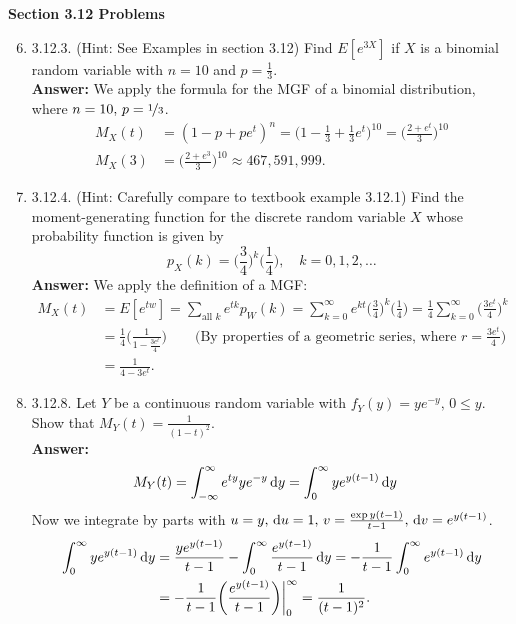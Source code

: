 \documentclass{article}
\begin{document}
    \noindent \textbf{Section 3.12 Problems}
    \begin{enumerate}\setcounter{enumi}{5}
        \item 3.12.3. (Hint: See Examples in section 3.12) Find $E[e^{3X}]$ if $X$ is a binomial random variable with $n = 10$ and $p = \frac{1}{3}$.\\
        \textbf{Answer: }We apply the formula for the MGF of a binomial distribution, where $n=10, \, p=\nicefrac{1}{3}$.
            \begin{align*}
                M_X(t) &= (1-p+pe^t)^n = \bigg(1-\frac{1}{3}+\frac{1}{3}e^t\bigg)^{10} = \bigg(\frac{2+e^t}{3}\bigg)^{10}\\
                M_X(3) &= \bigg(\frac{2+e^3}{3}\bigg)^{10} \approx 467,591,999.
            \end{align*}

        \item 3.12.4. (Hint: Carefully compare to textbook example 3.12.1) Find the moment-generating function for the discrete random variable $X$ whose probability function is given by
            \[p_X(k) = \bigg(\frac{3}{4}\bigg)^k\bigg(\frac{1}{4}\bigg), \quad k=0,1,2,\ldots\]
        \textbf{Answer: }We apply the definition of a MGF:
            \begin{align*}
                M_X(t) &= E[e^{tw}] = \sum_{\text{all $k$}} e^{tk} p_W(k) = \sum_{k=0}^\infty e^{kt}\bigg(\frac{3}{4}\bigg)^k\bigg(\frac{1}{4}\bigg) = \frac{1}{4}\sum_{k=0}^\infty \bigg(\frac{3e^t}{4}\bigg)^k\\
                &= \frac{1}{4}\bigg(\frac{1}{1-\frac{3e^t}{4}}\bigg) \qquad \text{(By properties of a geometric series, where $r = \frac{3e^t}{4}$)}\\
                &= \frac{1}{4-3e^t}.
            \end{align*}
        
        \item 3.12.8. Let $Y$ be a continuous random variable with $f_Y(y) = ye^{-y}, \, 0 \leq y$. Show that $M_Y(t) = \frac{1}{(1-t)^2}$.\\
        \textbf{Answer: }
            \begin{align*}
                M_Y(t) &= \int_{-\infty}^\infty e^{ty}ye^{-y} \dif y = \int_0^\infty ye^{y(t-1)} \dif y
            \end{align*}
        Now we integrate by parts with $u=y,\,\dif u=1,\,v=\frac{\exp{y(t-1)}}{t-1},\, \dif v = e^{y(t-1)}$.
            \begin{align*}
                \int_0^\infty ye^{y(t-1)} \dif y &= \frac{ye^{y(t-1)}}{t-1}-\int_0^\infty \frac{e^{y(t-1)}}{t-1} \dif y = -\frac{1}{t-1}\int_0^\infty e^{y(t-1)} \dif y\\
                &= -\frac{1}{t-1}\bigg(\frac{e^{y(t-1)}}{t-1}\bigg)\bigg|_0^\infty = \frac{1}{(t-1)^2}.
            \end{align*}
        

\end{enumerate}
\end{document}
